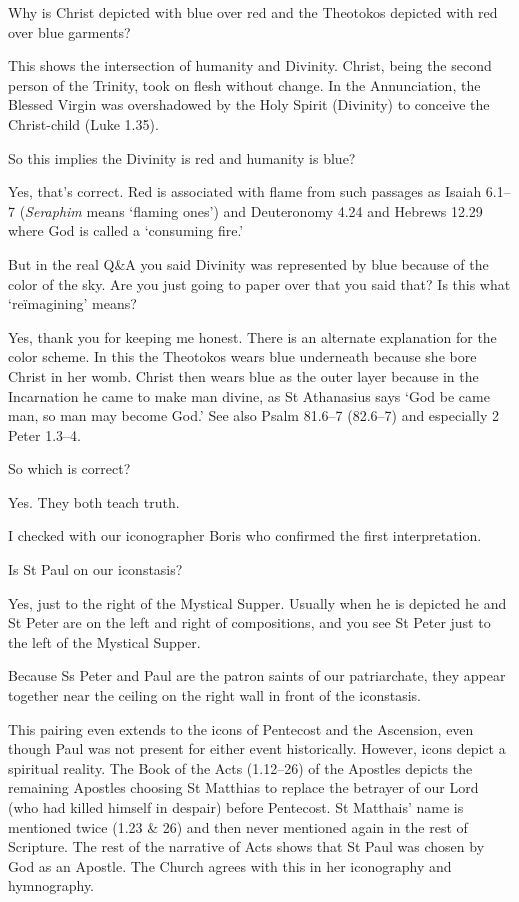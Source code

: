 \documentclass[
]{article}
\begin{document}
Why is Christ depicted with blue over red and the Theotokos depicted
with red over blue garments?

This shows the intersection of humanity and Divinity. Christ, being the
second person of the Trinity, took on flesh without change. In the
Annunciation, the Blessed Virgin was overshadowed by the Holy Spirit
(Divinity) to conceive the Christ-child (Luke 1.35).

So this implies the Divinity is red and humanity is blue?

Yes, that's correct. Red is associated with flame from such passages as
Isaiah 6.1--7 (\emph{Seraphim} means `flaming ones') and Deuteronomy
4.24 and Hebrews 12.29 where God is called a `consuming fire.'

But in the real Q\&A you said Divinity was represented by blue because
of the color of the sky. Are you just going to paper over that you said
that? Is this what `reïmagining' means?

Yes, thank you for keeping me honest. There is an alternate explanation
for the color scheme. In this the Theotokos wears blue underneath
because she bore Christ in her womb. Christ then wears blue as the outer
layer because in the Incarnation he came to make man divine, as St
Athanasius says `God be came man, so man may become God.' See also Psalm
81.6--7 (82.6--7) and especially 2 Peter 1.3--4.

So which is correct?

Yes. They both teach truth.

I checked with our iconographer Boris who confirmed the first
interpretation.

Is St Paul on our iconstasis?

Yes, just to the right of the Mystical Supper. Usually when he is
depicted he and St Peter are on the left and right of compositions, and
you see St Peter just to the left of the Mystical Supper.

Because Ss Peter and Paul are the patron saints of our patriarchate,
they appear together near the ceiling on the right wall in front of the
iconstasis.

This pairing even extends to the icons of Pentecost and the Ascension,
even though Paul was not present for either event historically. However,
icons depict a spiritual reality. The Book of the Acts (1.12--26) of the
Apostles depicts the remaining Apostles choosing St Matthias to replace
the betrayer of our Lord (who had killed himself in despair) before
Pentecost. St Matthais' name is mentioned twice (1.23 \& 26) and then
never mentioned again in the rest of Scripture. The rest of the
narrative of Acts shows that St Paul was chosen by God as an Apostle.
The Church agrees with this in her iconography and hymnography.
\end{document}
